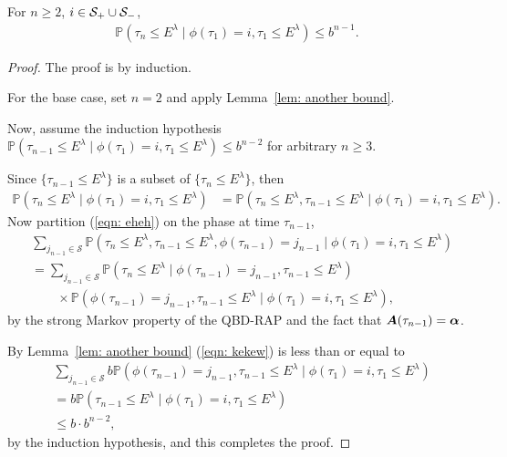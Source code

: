 \begin{lem}\label{lem: another bound 2}
	For \(n\geq 2\), \(i\in\mathcal S_+\cup \mathcal{S}_-\), 
	\begin{align}
		\mathbb P(\tau_n \leq E^\lambda \mid \phi(\tau_1) = i, \tau_1\leq E^\lambda) \leq b^{n-1}.
	\end{align}
\end{lem}
\begin{proof}
	The proof is by induction. 
	
	For the base case, set \(n=2\) and apply Lemma~\ref{lem: another bound}.

	Now, assume the induction hypothesis \(\mathbb P(\tau_{n-1} \leq E^\lambda \mid \phi(\tau_1) = i, \tau_1\leq E^\lambda) \leq b^{n-2}\) for arbitrary \(n\geq 3\). 
	
	Since \(\{\tau_{n-1}\leq E^\lambda\}\) is a subset of \(\{\tau_{n}\leq E^\lambda\}\), then 
	\begin{align}
		 \mathbb P(   \tau_n \leq E^\lambda \mid \phi(\tau_1) = i, \tau_1\leq E^\lambda)
		&= \mathbb P(   \tau_n \leq E^\lambda,  \tau_{n-1} \leq E^\lambda  \mid \phi(\tau_1) = i, \tau_1\leq E^\lambda). \label{eqn: eheh}
	\end{align}
	Now partition (\ref{eqn: eheh}) on the phase at time \(\tau_{n-1}\),
	\begin{align}
		\nonumber&\sum_{j_{n-1}\in\mathcal S}\mathbb P(  \tau_n \leq E^\lambda,  \tau_{n-1} \leq E^\lambda,\phi(\tau_{n-1}) = j_{n-1} \mid \phi(\tau_1) = i, \tau_1\leq E^\lambda)
		\\&\nonumber=  \sum_{j_{n-1}\in\mathcal S}\mathbb P(  \tau_{n}\leq E^\lambda\mid   \phi(\tau_{n-1}) = j_{n-1}, \tau_{n-1} \leq E^\lambda)
		\\&\qquad\times\mathbb P( \phi(\tau_{n-1}) = j_{n-1}, \tau_{n-1}\leq E^\lambda \mid \phi(\tau_1) = i, \tau_1\leq E^\lambda), \label{eqn: kekew}
	\end{align}
	by the strong Markov property of the QBD-RAP and the fact that \(\boldsymbol A(\tau_{n-1})=\boldsymbol \alpha\). 
	 
	By Lemma~\ref{lem: another bound} (\ref{eqn: kekew}) is less than or equal to 
	\begin{align}
		&\sum_{j_{n-1}\in\mathcal S} b
		\mathbb P(  \phi(\tau_{n-1}) = j_{n-1}, \tau_{n-1}\leq E^\lambda\mid \phi(\tau_1) = i, \tau_1\leq E^\lambda) \nonumber
		\\&= b
		\mathbb P( \tau_{n-1}\leq E^\lambda\mid \phi(\tau_1) = i, \tau_1\leq E^\lambda)\nonumber
		\\&\leq b\cdot b^{n-2},
	\end{align}
	by the induction hypothesis, and this completes the proof. 
\end{proof}
